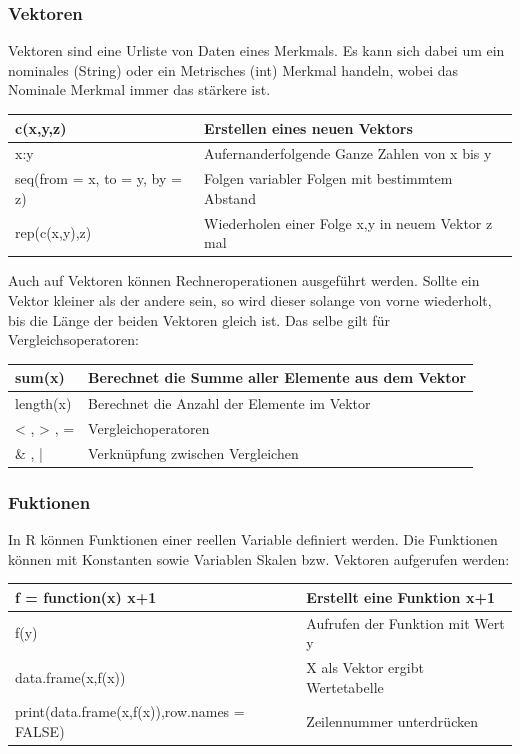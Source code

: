 \documentclass[a4paper,10pt]{scrartcl}
\begin{document}
\subsubsection{Vektoren}
Vektoren sind eine Urliste von Daten eines Merkmals. Es kann sich dabei um ein nominales (String) oder ein Metrisches (int) Merkmal handeln, wobei das Nominale Merkmal immer das stärkere ist.
\begin{table}[H]
    \begin{tabular}{|l|l|}
    \hline
c(x,y,z) & Erstellen eines neuen Vektors\\\hline
x:y & Aufernanderfolgende Ganze Zahlen von x bis y\\\hline
seq(from = x, to = y, by = z) & Folgen variabler Folgen mit bestimmtem Abstand\\\hline
rep(c(x,y),z) & Wiederholen einer Folge x,y in neuem Vektor z mal\\\hline
    \end{tabular}
    \label{tab:my_label}
\end{table}
\newpage
Auch auf Vektoren können Rechneroperationen ausgeführt werden. Sollte ein Vektor kleiner als der andere sein, so wird dieser solange von vorne wiederholt, bis die Länge der beiden Vektoren gleich ist. Das selbe gilt für Vergleichsoperatoren:
\begin{table}[h]
    \begin{tabular}{|l|l|}\hline
sum(x) & Berechnet die Summe aller Elemente aus dem Vektor\\\hline
length(x) & Berechnet die Anzahl der Elemente im Vektor\\\hline
 < , > , = & Vergleichoperatoren\\\hline
 \& , | & Verknüpfung zwischen Vergleichen\\\hline 
\end{tabular}
\label{tab:my_label}
\end{table}
\subsubsection{Fuktionen}
In R können Funktionen einer reellen Variable definiert werden. Die Funktionen können mit Konstanten sowie Variablen Skalen bzw. Vektoren aufgerufen werden:
\begin{table}[h]
    \centering
    \begin{tabular}{|l|l|}\hline
f = function(x) {x+1} &  Erstellt eine Funktion x+1 \\\hline
f(y) & Aufrufen der Funktion mit Wert y\\\hline
data.frame(x,f(x)) & X als Vektor ergibt Wertetabelle\\\hline
print(data.frame(x,f(x)),row.names = FALSE) & Zeilennummer unterdrücken\\\hline
    \end{tabular}
    \label{tab:my_label}
\end{table}
\end{document}
